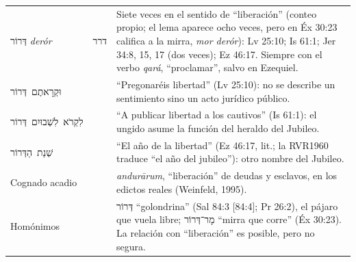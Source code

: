 \documentclass[11pt,letterpaper]{article}
\newcommand{\heb}[1]{\mbox{\foreignlanguage{hebrew}{#1}}}
\begin{document}
\begin{filologia}
\begin{tabular}{@{}L{3.3cm}L{1.4cm}L{9.85cm}@{}}
\heb{דְּרוֹר} \emph{derór} & \heb{דרר} & Siete veces en el sentido de ``liberación'' (conteo propio; el lema aparece ocho veces, pero en Éx 30:23 califica a la mirra, \emph{mor derór}): Lv 25:10; Is 61:1; Jer 34:8, 15, 17 (dos veces); Ez 46:17. Siempre con el verbo \emph{qará}, ``proclamar'', salvo en Ezequiel. \\[2pt]
\heb{וּקְרָאתֶם דְּרוֹר} & & ``Pregonaréis libertad'' (Lv 25:10): no se describe un sentimiento sino un acto jurídico público. \\[2pt]
\heb{לִקְרֹא לִשְׁבוּיִם דְּרוֹר} & & ``A publicar libertad a los cautivos'' (Is 61:1): el ungido asume la función del heraldo del Jubileo. \\[2pt]
\heb{שְׁנַת הַדְּרוֹר} & & ``El año de la libertad'' (Ez 46:17, lit.; la RVR1960 traduce ``el año del jubileo''): otro nombre del Jubileo. \\[2pt]
Cognado acadio & & \emph{andurārum}, ``liberación'' de deudas y esclavos, en los edictos reales (Weinfeld, 1995). \\[2pt]
Homónimos & & \heb{דְּרוֹר} ``golondrina'' (Sal 84:3 [84:4]; Pr 26:2), el pájaro que vuela libre; \heb{מָר־דְּרוֹר} ``mirra que corre'' (Éx 30:23). La relación con ``liberación'' es posible, pero no segura. \\
\end{tabular}
\end{filologia}
\end{document}
